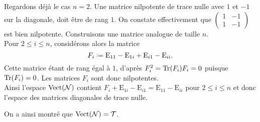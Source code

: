 \begin{solution}
\begin{itemize}
        Regardons déjà le cas $n = 2$. Une matrice nilpotente de trace nulle avec $1$ et $-1$ sur la diagonale, doit être de rang $1$. On constate effectivement que $\begin{pmatrix} 1 & -1 \\ 1 & -1 \end{pmatrix}$ est bien nilpotente. Construisons une matrice analogue de taille $n$. \\
        Pour $2 \leqslant i \leqslant n$, considérons alors la matrice
        $$F_i \defeq \mathrm{E}_{11} - \mathrm{E}_{1i} + \mathrm{E}_{i1} - \mathrm{E}_{ii}.$$
        Cette matrice étant de rang égal à $1$, d'après  $F_i^2 = \mathrm{Tr} (F_i) F_i = 0$ puisque $\mathrm{Tr}(F_i) = 0$. Les matrices $F_i$ sont donc nilpotentes. \\
        Ainsi l'espace $\mathrm{Vect}(\mathcal{N})$ contient $F_i + \mathrm{E}_{1i} - \mathrm{E}_{i1} = \mathrm{E}_{11}-\mathrm{E}_{ii}$ pour $2 \leqslant i \leqslant n$ et donc l'espace des matrices diagonales de trace nulle. 
    \end{itemize}
    On a ainsi montré que $\mathrm{Vect}(\mathcal{N}) = \mathcal{T}$.
\end{solution}

